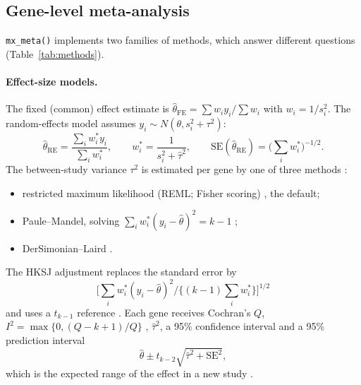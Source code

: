 \documentclass[11pt,a4paper]{article}
\begin{document}
\subsection{Gene-level meta-analysis}
\texttt{mx\_meta()} implements two families of methods, which answer different questions (Table~\ref{tab:methods}).

\paragraph{Effect-size models.} The fixed (common) effect estimate is $\hat\theta_{\mathrm{FE}} = \sum w_i y_i/\sum w_i$ with $w_i = 1/s_i^2$. The random-effects model assumes $y_i \sim N(\theta, s_i^2 + \tau^2)$:
\begin{equation}
    \hat\theta_{\mathrm{RE}} = \frac{\sum_i w_i^* y_i}{\sum_i w_i^*}, \qquad w_i^* = \frac{1}{s_i^2 + \hat\tau^2}, \qquad \mathrm{SE}(\hat\theta_{\mathrm{RE}}) = \Big(\sum_i w_i^*\Big)^{-1/2}.
\end{equation}
The between-study variance $\tau^2$ is estimated per gene by one of three methods \cite{veroniki2016methods, langan2019comparison}:
\begin{itemize}[noitemsep,topsep=2pt]
    \item restricted maximum likelihood (REML; Fisher scoring) \cite{viechtbauer2005bias}, the default;
    \item Paule--Mandel, solving $\sum_i w_i^*(y_i-\hat\theta)^2 = k-1$ \cite{paule1982consensus};
    \item DerSimonian--Laird \cite{dersimonian1986meta}.
\end{itemize}
The HKSJ adjustment replaces the standard error by
\[
\big[\sum_i w_i^*(y_i-\hat\theta)^2/\{(k-1)\sum_i w_i^*\}\big]^{1/2}
\]
and uses a $t_{k-1}$ reference \cite{hartung2001refined, inthout2014hksj}. Each gene receives Cochran's $Q$, $I^2 = \max\{0, (Q-k+1)/Q\}$ \cite{higgins2002quantifying}, $\hat\tau^2$, a 95\% confidence interval and a 95\% prediction interval
\[
\hat\theta \pm t_{k-2}\sqrt{\hat\tau^2 + \mathrm{SE}^2},
\]
which is the expected range of the effect in a new study \cite{higgins2009reevaluation}.
\end{document}
